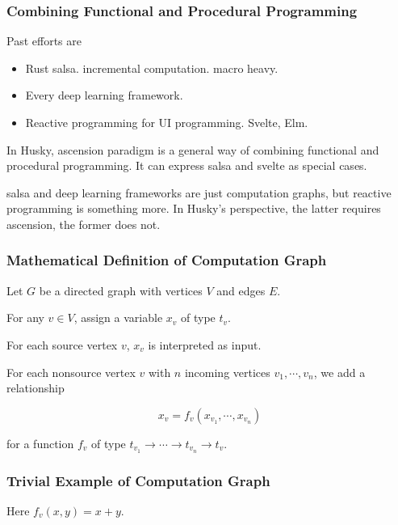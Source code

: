 \documentclass{beamer}   	%
\theoremstyle{definition}
\begin{document}
\begin{frame}
\frametitle{Combining Functional and Procedural Programming}
Past efforts are
\begin{itemize}
	\item Rust salsa. incremental computation. macro heavy.
	\item Every deep learning framework.
	\item Reactive programming for UI programming. Svelte, Elm.
\end{itemize}

In Husky, ascension paradigm is a general way of combining functional and procedural programming. It can express salsa and svelte as special cases.

{
\color{gray}
salsa and deep learning frameworks are just computation graphs, but reactive programming is something more. In Husky's perspective, the latter requires ascension, the former does not.}
\end{frame}

\begin{frame}
\frametitle{Mathematical Definition of Computation Graph}
Let $G$ be a directed graph with vertices $V$ and edges $E$.

For any $v\in V$, assign a variable $x_v$ of type $t_v$.

For each source vertex $v$, $x_v$ is interpreted as input.

For each nonsource vertex $v$ with $n$ incoming vertices $v_1,\cdots,v_n$, we add a relationship

$$x_v=f_v(x_{v_1},\cdots,x_{v_n})$$

for a function $f_v$ of type $t_{v_1}\to\cdots\to t_{v_n}\to t_v$.
\end{frame}

\begin{frame}
\frametitle{Trivial Example of Computation Graph}
\begin{center}
\end{center}

Here $f_v(x,y)=x+y$.
	
\end{frame}
\end{document}
